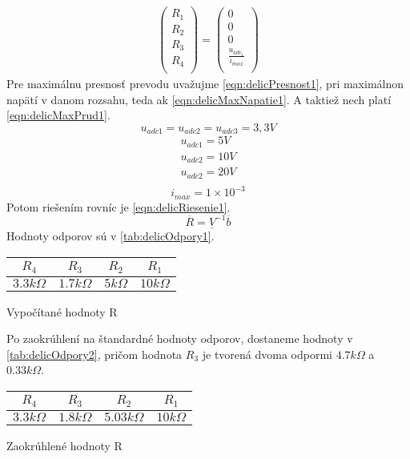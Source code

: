 \documentclass[main.tex]{subfiles}
\begin{document}
\begin{multicols*}{2}
\begin{equation}
\begin{split}
		\begin{pmatrix}
		R_1 \\
		R_2 \\
		R_3 \\
		R_4  \\
		\end{pmatrix} =
		\begin{pmatrix}
		0 \\
		0 \\
		0 \\
		\frac{u_{adc_1}}{i_{max}}  \\
		\end{pmatrix}
		\end{split}
		\label{eqn:delicMatica2}
		\end{equation}
		Pre maximálnu presnosť prevodu uvažujme \cref{eqn:delicPresnost1}, pri maximálnon napätí v danom rozsahu, teda ak \cref{eqn:delicMaxNapatie1}. A taktiež nech platí \cref{eqn:delicMaxPrud1}. 
		\begin{equation}
		u_{adc1} = u_{adc2} = u_{adc3} = 3,3V \label{eqn:delicPresnost1}
		\end{equation}
		\begin{equation}
		\begin{split}
		u_{adc1} = 5 V\\
		u_{adc2} = 10 V \\
		u_{adc2} = 20 V\\ \label{eqn:delicMaxNapatie1}
		\end{split}
		\end{equation}
		\begin{equation}
		i_{max} = 1\times 10 ^{-3} \label{eqn:delicMaxPrud1}
		\end{equation}
		Potom riešením rovníc je \cref{eqn:delicRiesenie1}.
		\begin{equation}
		\overline{R} = \underline{V}^{-1}\overline{b} \label{eqn:delicRiesenie1}
		\end{equation}
		Hodnoty odporov sú v \cref{tab:delicOdpory1}.
		\vskip 0.05cm
		\begin{tablehere}
			\centering
			\begin{tabular}{cccc}
				$R_4$ & $R_3$ & $R_2$ & $R_1$ \\
				\hline
				$3.3k\Omega$ & $1.7k\Omega$ & $5k\Omega$ & $10k\Omega$ \\
			\end{tabular}
			\caption{Vypočítané hodnoty R} \label{tab:delicOdpory1}
			\vskip 0.1cm
		\end{tablehere}
		\noindent Po zaokrúhlení na štandardné hodnoty odporov, dostaneme hodnoty v \cref{tab:delicOdpory2}, pričom hodnota $R_3$ je tvorená dvoma odpormi $4.7k\Omega$ a $0.33k\Omega$.
		\vskip 0.1cm
		\begin{tablehere}
			\centering
			\begin{tabular}{cccc}
				$R_4$ & $R_3$ & $R_2$ & $R_1$ \\
				\hline
				$3.3k\Omega$ & $1.8k\Omega$ & $5.03k\Omega$ & $10k\Omega$ \\
			\end{tabular}
			\caption{Zaokrúhlené hodnoty R} \label{tab:delicOdpory2}
		\end{tablehere}
	\end{multicols*}
\end{document}
